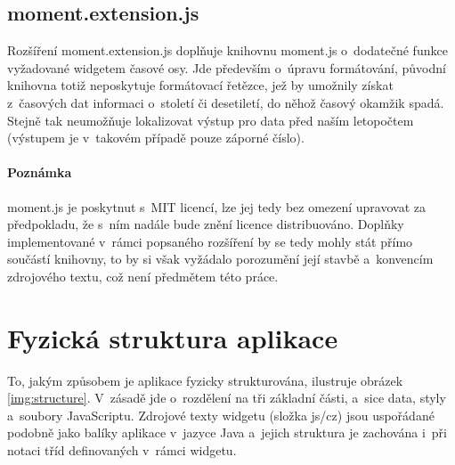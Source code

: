 			
		
		\subsection{\sf moment.extension.js}
			Rozšíření {\sf moment.extension.js} doplňuje knihovnu {\sf moment.js} o~dodatečné funkce vyža\-dované widgetem časové osy. Jde především o~úpravu formátování, původní knihovna totiž neposkytuje formátovací řetězce, jež by umožnily získat z~časových dat informaci o~století či desetiletí, do něhož časový okamžik spadá. Stejně tak neumožňuje lokalizovat výstup pro data před naším letopočtem (výstupem je v~takovém případě pouze záporné číslo).
			
			\paragraph{Poznámka}
			{\sf moment.js} je poskytnut s~MIT licencí, lze jej tedy bez omezení upravovat za předpokladu, že s~ním nadále bude znění licence distribuováno. Doplňky implementované v~rámci popsaného rozšíření by se tedy mohly stát přímo součástí knihovny, to by si však vyžádalo porozumění její stavbě a~konvencím zdrojového textu, což není předmětem této práce.
	
	\section{Fyzická struktura aplikace}
		\label{fyzicka-struktura}
		To, jakým způsobem je aplikace fyzicky strukturována, ilustruje obrázek \ref{img:structure}. V~zásadě jde o~rozdělení na tři základní části, a~sice data, styly a~soubory JavaScriptu. Zdrojové texty widgetu (složka {\sf js/cz}) jsou uspořádané podobně jako balíky aplikace v~jazyce {\sf Java} a~jejich struktura je zachována i~při notaci tříd definovaných v~rámci widgetu.
		\newpage
		
